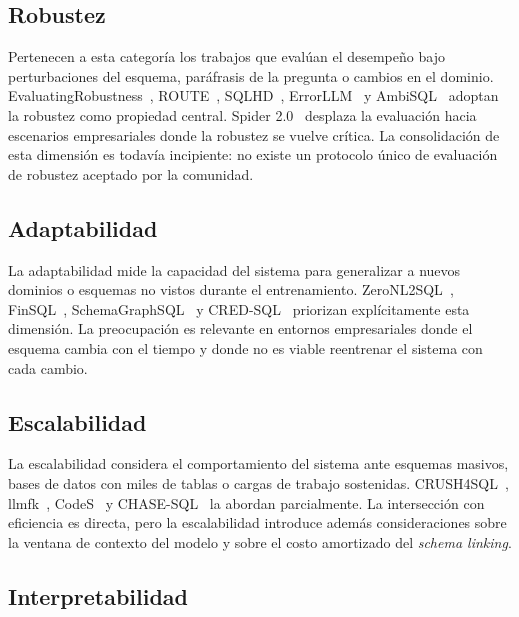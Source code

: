 \subsection{Robustez}
\label{subsec:sota-d6-robustez}

Pertenecen a esta categoría los trabajos que evalúan el desempeño bajo
perturbaciones del esquema, paráfrasis de la pregunta o cambios en el
dominio. EvaluatingRobustness~\cite{EvaluatingRobustness},
ROUTE~\cite{ROUTE2025}, SQLHD~\cite{SQLHD2025},
ErrorLLM~\cite{errorllm2026} y AmbiSQL~\cite{AmbiSQL} adoptan la
robustez como propiedad central. Spider 2.0~\cite{spider2_2025}
desplaza la evaluación hacia escenarios empresariales donde la
robustez se vuelve crítica. La consolidación de esta dimensión es
todavía incipiente: no existe un protocolo único de evaluación de
robustez aceptado por la comunidad.

\subsection{Adaptabilidad}
\label{subsec:sota-d6-adaptabilidad}

La adaptabilidad mide la capacidad del sistema para generalizar a
nuevos dominios o esquemas no vistos durante el entrenamiento.
ZeroNL2SQL~\cite{ZeroNL2SQL2024}, FinSQL~\cite{FinSQL2024},
SchemaGraphSQL~\cite{SchemaGraphSQL} y CRED-SQL~\cite{CRED-SQL2025}
priorizan explícitamente esta dimensión. La preocupación es relevante
en entornos empresariales donde el esquema cambia con el tiempo y donde
no es viable reentrenar el sistema con cada cambio.

\subsection{Escalabilidad}
\label{subsec:sota-d6-escalabilidad}

La escalabilidad considera el comportamiento del sistema ante esquemas
masivos, bases de datos con miles de tablas o cargas de trabajo
sostenidas. CRUSH4SQL~\cite{CRUSH4SQL2023}, llmfk~\cite{llmfk},
CodeS~\cite{CodeS2024} y CHASE-SQL~\cite{CHASE-SQL2025} la abordan
parcialmente. La intersección con eficiencia es directa, pero la
escalabilidad introduce además consideraciones sobre la ventana de
contexto del modelo y sobre el costo amortizado del \emph{schema
linking}.

\subsection{Interpretabilidad}
\label{subsec:sota-d6-interpretabilidad}


